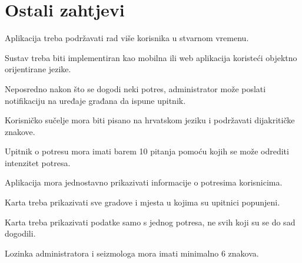 		\section{Ostali zahtjevi}
				\begin{packed_item}
					\item Aplikacija treba podržavati rad više korisnika u stvarnom vremenu.
					\item Sustav treba biti implementiran kao mobilna ili web aplikacija koristeći objektno orijentirane jezike.
					\item Neposredno nakon što se dogodi neki potres, administrator može poslati notifikaciju na uređaje građana da ispune upitnik.
					\item Korisničko sučelje mora biti pisano na hrvatskom jeziku i podržavati dijakritičke znakove.
					\item Upitnik o potresu mora imati barem 10 pitanja pomoću kojih se može odrediti intenzitet potresa.
					\item Aplikacija mora jednostavno prikazivati informacije o potresima korisnicima.
					\item Karta treba prikazivati sve gradove i mjesta u kojima su upitnici popunjeni.
					\item Karta treba prikazivati podatke samo s jednog potresa, ne svih koji su se do sad dogodili.
					\item Lozinka administratora i seizmologa mora imati minimalno 6 znakova.
				\end{packed_item}
